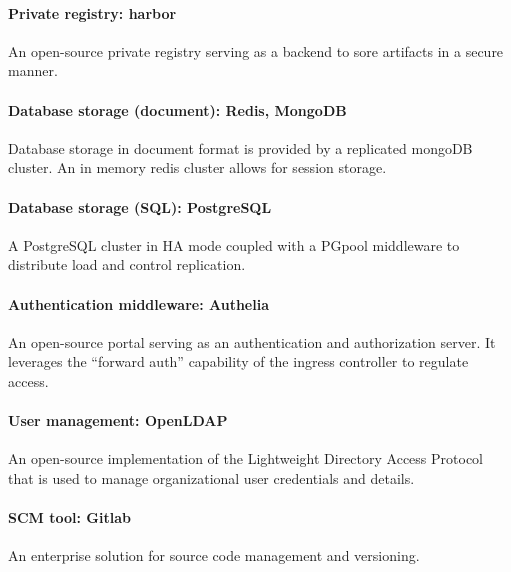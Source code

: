 \paragraph{Private registry: harbor }

\hspace{7mm}An open-source private registry serving as a backend to sore artifacts in a secure manner. 

\paragraph{Database storage (document): Redis, MongoDB }

\hspace{7mm}Database storage in document format is provided by a replicated mongoDB cluster. An in memory redis cluster allows for session storage. 

\paragraph{Database storage (SQL): PostgreSQL }

\hspace{7mm}A PostgreSQL cluster in HA mode coupled with a PGpool middleware to distribute load and control replication. 

\paragraph{Authentication middleware: Authelia }

\hspace{7mm}An open-source portal serving as an authentication and authorization server. It leverages the “forward auth” capability of the ingress controller to regulate access. 

\paragraph{User management: OpenLDAP }

\hspace{7mm}An open-source implementation of the Lightweight Directory Access Protocol that is used to manage organizational user credentials and details. 

\paragraph{SCM tool: Gitlab }

\hspace{7mm}An enterprise solution for source code management and versioning. 

